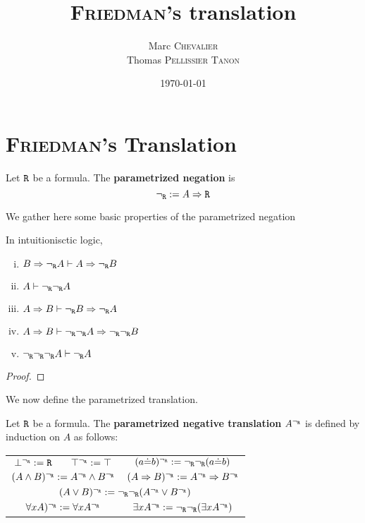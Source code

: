 

\author{
    Marc \textsc{Chevalier}\\
    Thomas \textsc{Pellissier} \textsc{Tanon}}
\date{\today}
\title{\textsc{Friedman}'s translation}



\maketitle

\section{\textsc{Friedman}'s Translation}

\begin{definition}
    Let $\texttt{R}$ be a formula. The \textbf{parametrized negation} is 
    $$
        {\neg_{\texttt{R}}} := A \Rightarrow \texttt{R}
    $$
\end{definition}

We gather here some basic properties of the parametrized negation

\begin{proposition}
    In intuitionisctic logic,
    \begin{enumerate}[(i)]
        \item $B \Rightarrow {\neg_{\texttt{R}}} A \vdash A \Rightarrow {\neg_{\texttt{R}}} B$
        \item $A\vdash {\neg_{\texttt{R}}}{\neg_{\texttt{R}}} A$
        \item $A\Rightarrow B \vdash {\neg_{\texttt{R}}} B \Rightarrow {\neg_{\texttt{R}}} A$
        \item $A\Rightarrow B \vdash {\neg_{\texttt{R}}}{\neg_{\texttt{R}}} A \Rightarrow {\neg_{\texttt{R}}} {\neg_{\texttt{R}}} B$
        \item ${\neg_{\texttt{R}}} {\neg_{\texttt{R}}} {\neg_{\texttt{R}}} A \vdash {\neg_{\texttt{R}}} A$
    \end{enumerate}
\end{proposition}
\begin{proof}
    
\end{proof}

We now define the parametrized translation.
\begin{definition}
    Let $\texttt{R}$ be a formula. The \textbf{parametrized negative translation} $A^{\neg_{\texttt{R}}}$ is defined by induction on $A$ as follows:
    \begin{center}
    \begin{tabular}{cccc}
        $\bot^{\neg_{\texttt{R}}} := \texttt{R}$ & $\top^{\neg_{\texttt{R}}} := \top$ & \multicolumn{2}{c}{$(a\dot{=}b)^{\neg_{\texttt{R}}} := {\neg_{\texttt{R}}}{\neg_{\texttt{R}}}(a\dot{=}b)$}\\
        \multicolumn{2}{c}{$(A\wedge B)^{{\neg_{\texttt{R}}}}:=A^{\neg_{\texttt{R}}} \wedge B^{\neg_{\texttt{R}}}$} & \multicolumn{2}{c}{$(A \Rightarrow B)^{\neg_{\texttt{R}}}:=A^{\neg_{\texttt{R}}} \Rightarrow B^{\neg_{\texttt{R}}}$}\\
        \multicolumn{4}{c}{$(A \vee B)^{\neg_{\texttt{R}}}:={\neg_{\texttt{R}}}{\neg_{\texttt{R}}}(A^{\neg_{\texttt{R}}} \vee B^{\neg_{\texttt{R}}})$}\\
        \multicolumn{2}{c}{$\forall x A)^{\neg_{\texttt{R}}} := \forall x A^{\neg_{\texttt{R}}}$} & \multicolumn{2}{c}{$\exists x A^{\neg_{\texttt{R}}} := {\neg_{\texttt{R}}}{\neg_{\texttt{R}}}(\exists x A^{\neg_{\texttt{R}}})$}
    \end{tabular}
    \end{center}
\end{definition}

